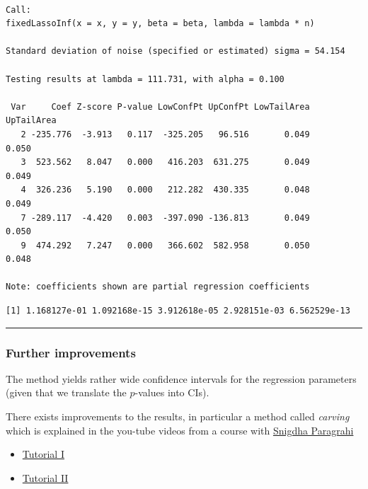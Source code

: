 \documentclass[
  letterpaper,
  DIV=11,
  numbers=noendperiod]{scrartcl}
\providecommand{\tightlist}{%
  \setlength{\itemsep}{0pt}\setlength{\parskip}{0pt}}\usepackage{longtable,booktabs,array}
\begin{document}
\begin{verbatim}

Call:
fixedLassoInf(x = x, y = y, beta = beta, lambda = lambda * n)

Standard deviation of noise (specified or estimated) sigma = 54.154

Testing results at lambda = 111.731, with alpha = 0.100

 Var     Coef Z-score P-value LowConfPt UpConfPt LowTailArea UpTailArea
   2 -235.776  -3.913   0.117  -325.205   96.516       0.049      0.050
   3  523.562   8.047   0.000   416.203  631.275       0.049      0.049
   4  326.236   5.190   0.000   212.282  430.335       0.048      0.049
   7 -289.117  -4.420   0.003  -397.090 -136.813       0.049      0.050
   9  474.292   7.247   0.000   366.602  582.958       0.050      0.048

Note: coefficients shown are partial regression coefficients
\end{verbatim}

\begin{verbatim}
[1] 1.168127e-01 1.092168e-15 3.912618e-05 2.928151e-03 6.562529e-13
\end{verbatim}

\begin{center}\rule{0.5\linewidth}{0.5pt}\end{center}

\normalsize

\hypertarget{further-improvements}{%
\subsubsection{Further improvements}\label{further-improvements}}

The method yields rather wide confidence intervals for the regression
parameters (given that we translate the \(p\)-values into CIs).

There exists improvements to the results, in particular a method called
\emph{carving} which is explained in the you-tube videos from a course
with
\href{https://lsa.umich.edu/stats/people/faculty/psnigdha.html}{Snigdha
Paragrahi}

\begin{itemize}
\tightlist
\item
  \href{https://www.youtube.com/watch?v=qofrkW-DL7c\&t=3682s}{Tutorial
  I}
\item
  \href{https://www.youtube.com/watch?v=rGHf6BPeqBg\&t=1105s}{Tutorial
  II}
\end{itemize}
\end{document}
